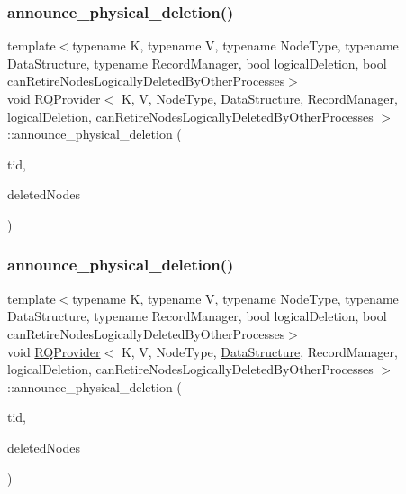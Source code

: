 \mbox{\label{classRQProvider_a29337e6766144d1c1a9aa752fe73fabf}} 
\subsubsection{\texorpdfstring{announce\+\_\+physical\+\_\+deletion()}{announce\_physical\_deletion()}\hspace{0.1cm}{\footnotesize\ttfamily [4/5]}}
{\footnotesize\ttfamily template$<$typename K, typename V, typename Node\+Type, typename Data\+Structure, typename Record\+Manager, bool logical\+Deletion, bool can\+Retire\+Nodes\+Logically\+Deleted\+By\+Other\+Processes$>$ \\
void \hyperlink{classRQProvider}{R\+Q\+Provider}$<$ K, V, Node\+Type, \hyperlink{classDataStructure}{Data\+Structure}, Record\+Manager, logical\+Deletion, can\+Retire\+Nodes\+Logically\+Deleted\+By\+Other\+Processes $>$\+::announce\+\_\+physical\+\_\+deletion (\begin{DoxyParamCaption}\item[{const int}]{tid,  }\item[{Node\+Type $\ast$const $\ast$const}]{deleted\+Nodes }\end{DoxyParamCaption})\hspace{0.3cm}{\ttfamily [inline]}}

\mbox{\label{classRQProvider_a29337e6766144d1c1a9aa752fe73fabf}} 
\subsubsection{\texorpdfstring{announce\+\_\+physical\+\_\+deletion()}{announce\_physical\_deletion()}\hspace{0.1cm}{\footnotesize\ttfamily [5/5]}}
{\footnotesize\ttfamily template$<$typename K, typename V, typename Node\+Type, typename Data\+Structure, typename Record\+Manager, bool logical\+Deletion, bool can\+Retire\+Nodes\+Logically\+Deleted\+By\+Other\+Processes$>$ \\
void \hyperlink{classRQProvider}{R\+Q\+Provider}$<$ K, V, Node\+Type, \hyperlink{classDataStructure}{Data\+Structure}, Record\+Manager, logical\+Deletion, can\+Retire\+Nodes\+Logically\+Deleted\+By\+Other\+Processes $>$\+::announce\+\_\+physical\+\_\+deletion (\begin{DoxyParamCaption}\item[{const int}]{tid,  }\item[{Node\+Type $\ast$const $\ast$const}]{deleted\+Nodes }\end{DoxyParamCaption})\hspace{0.3cm}{\ttfamily [inline]}}

